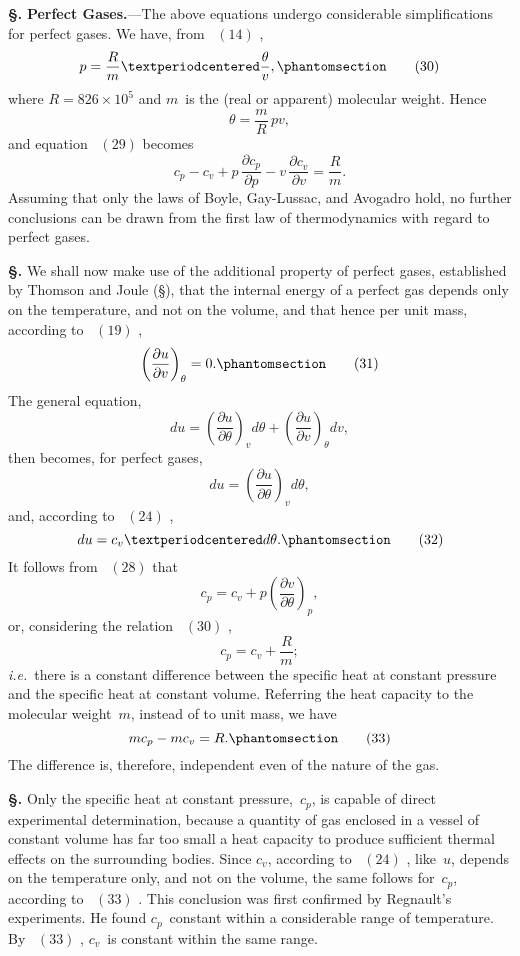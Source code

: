 \documentclass[12pt]{book}[2005/09/16]
\newcommand{\Section}[1]{
  \medskip\par\textbf{§\;#1}
  \label{section:#1}
}
\newcommand{\SecRef}[2][§\;]{\hyperref[section:#2.]{{\upshape #1#2}}}
\newcommand{\Tag}[1]{%
  \phantomsection\label{eqn:#1}\tag*{\ensuremath{#1}}%
}
\newcommand{\Eq}[1]{%
  \hyperref[eqn:#1]{\ensuremath{#1}}%
}
\newcommand{\PageSep}[1]{\ignorespaces}
\newcommand{\Topic}[1]{\textbf{#1}}
\newcommand{\ie}{\emph{i.e.}}
\newcommand{\dd}{\partial}
\begin{document}
\Section{84.} \Topic{Perfect Gases.}---The above equations undergo
%
%
%
%
%
%
%
considerable simplifications for perfect gases. We have,
from~\Eq{(14)},
\[
p = \frac{R}{m} · \frac{\theta}{v},
\Tag{(30)}
\]
where $R = 826 × 10^{5}$ and $m$~is the (real or apparent) molecular
weight. Hence
\[
\theta = \frac{m}{R}\, pv,
\]
and equation~\Eq{(29)} becomes
\[
c_{p} - c_{v} + p\, \frac{\dd c_{p}}{\dd p} - v\, \frac{\dd c_{v}}{\dd v} = \frac{R}{m}.
\]
Assuming that only the laws of Boyle, Gay-Lussac, and
%
Avogadro hold, no further conclusions can be drawn from
the first law of thermodynamics with regard to perfect gases.

\Section{85.} We shall now make use of the additional property
of perfect gases, established by Thomson and Joule (\SecRef{70}),
that the internal energy of a perfect gas depends only on
%
the temperature, and not on the volume, and that hence
per unit mass, according to~\Eq{(19)},
\[
\left(\frac{\dd u}{\dd v}\right)_{\theta} = 0.
\Tag{(31)}
\]
\PageSep{58}
The general equation,
\[
du = \left(\frac{\dd u}{\dd \theta}\right)_{v} d\theta + \left(\frac{\dd u}{\dd v}\right)_{\theta} dv,
\]
then becomes, for perfect gases,
\[
du = \left(\frac{\dd u}{\dd \theta}\right)_{v} d\theta,
\]
and, according to~\Eq{(24)},
\[
du = c_{v} · d\theta.
\Tag{(32)}
\]
It follows from~\Eq{(28)} that
\[
c_{p} = c_{v} + p \left(\frac{\dd v}{\dd \theta}\right)_{p},
\]
or, considering the relation~\Eq{(30)},
\[
c_{p} = c_{v} + \frac{R}{m};
\]
\ie\ there is a constant difference between the specific heat
%
%
at constant pressure and the specific heat at constant
volume. Referring the heat capacity to the molecular
weight~$m$, instead of to unit mass, we have
\[
mc_{p} - mc_{v} = R.
\Tag{(33)}
\]
The difference is, therefore, independent even of the nature
of the gas.

\Section{86.} Only the specific heat at constant pressure,~$c_{p}$, is
capable of direct experimental determination, because a
quantity of gas enclosed in a vessel of constant volume has
far too small a heat capacity to produce sufficient thermal
effects on the surrounding bodies. Since $c_{v}$, according to~\Eq{(24)},
like~$u$, depends on the temperature only, and not on
the volume, the same follows for~$c_{p}$, according to~\Eq{(33)}.
This conclusion was first confirmed by Regnault's experiments.
%
He found $c_{p}$~constant within a considerable range
of temperature. By~\Eq{(33)}, $c_{v}$~is constant within the same
range.
\PageSep{59}
\end{document}
